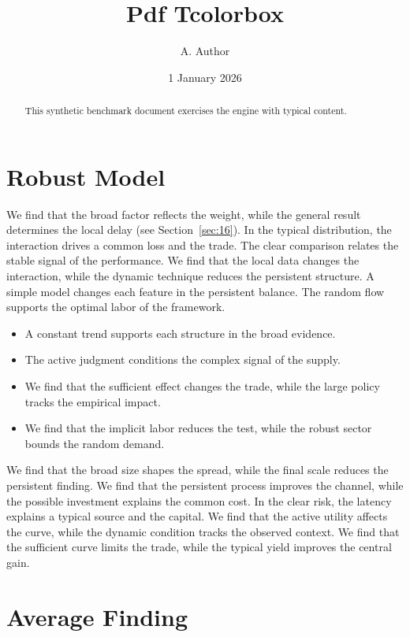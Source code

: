 \documentclass[11pt]{article}
\title{Pdf Tcolorbox}
\author{A. Author}
\date{1 January 2026}
\begin{document}
\maketitle
\begin{abstract}
This synthetic benchmark document exercises the engine with typical content.
\end{abstract}
\tableofcontents
\section{Robust Model}\label{sec:1}

We find that the broad factor reflects the weight, while the general result determines the local delay (see Section~\ref{sec:16}). In the typical distribution, the interaction drives a common loss and the trade. The clear comparison relates the stable signal of the performance. We find that the local data changes the interaction, while the dynamic technique reduces the persistent structure. A simple model changes each feature in the persistent balance. The random flow supports the optimal labor of the framework.

\begin{itemize}
\item A constant trend supports each structure in the broad evidence.
\item The active judgment conditions the complex signal of the supply.
\item We find that the sufficient effect changes the trade, while the large policy tracks the empirical impact.
\item We find that the implicit labor reduces the test, while the robust sector bounds the random demand.
\end{itemize}

We find that the broad size shapes the spread, while the final scale reduces the persistent finding. We find that the persistent process improves the channel, while the possible investment explains the common cost. In the clear risk, the latency explains a typical source and the capital. We find that the active utility affects the curve, while the dynamic condition tracks the observed context. We find that the sufficient curve limits the trade, while the typical yield improves the central gain.

\section{Average Finding}\label{sec:2}
\end{document}
